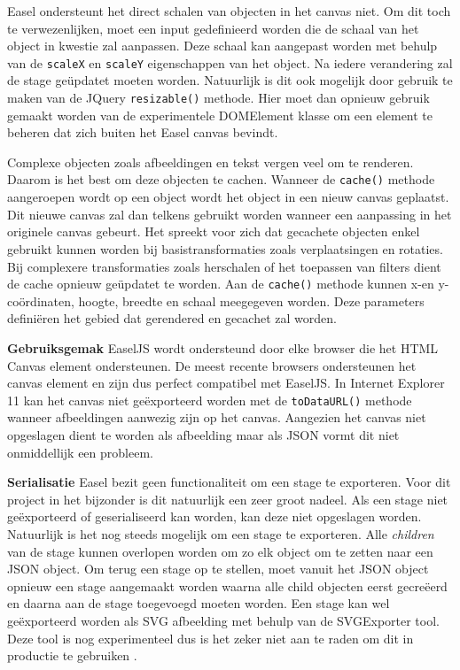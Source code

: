 Easel ondersteunt het direct schalen van objecten in het canvas niet. Om dit toch te verwezenlijken, moet een input gedefinieerd worden die de schaal van het object in kwestie zal aanpassen. Deze schaal kan aangepast worden met behulp van de \texttt{scaleX} en \texttt{scaleY} eigenschappen van het object. Na iedere verandering zal de stage ge\"{u}pdatet moeten worden. Natuurlijk is dit ook mogelijk door gebruik te maken van de JQuery \texttt{resizable()} methode. Hier moet dan opnieuw gebruik gemaakt worden van de experimentele DOMElement klasse om een element te beheren dat zich buiten het Easel canvas bevindt. 

Complexe objecten zoals afbeeldingen en tekst vergen veel om te renderen. Daarom is het best om deze objecten te cachen. Wanneer de \texttt{cache()} methode aangeroepen wordt op een object wordt het object in een nieuw canvas geplaatst. Dit nieuwe canvas zal dan telkens gebruikt worden wanneer een aanpassing in het originele canvas gebeurt. Het spreekt voor zich dat gecachete objecten enkel gebruikt kunnen worden bij basistransformaties zoals verplaatsingen en rotaties. Bij complexere transformaties zoals herschalen of het toepassen van filters dient de cache opnieuw ge\"{u}pdatet te worden. Aan de \texttt{cache()} methode kunnen x-en y-co\"{o}rdinaten, hoogte, breedte en schaal meegegeven worden. Deze parameters defini\"{e}ren het gebied dat gerendered en gecachet zal worden. 

\textbf{Gebruiksgemak} \break
EaselJS wordt ondersteund door elke browser die het HTML Canvas element ondersteunen. De meest recente browsers ondersteunen het canvas element en zijn dus perfect compatibel met EaselJS. In Internet Explorer 11 kan het canvas niet ge\"{e}xporteerd worden met de \texttt{toDataURL()} methode wanneer afbeeldingen aanwezig zijn op het canvas. Aangezien het canvas niet opgeslagen dient te worden als afbeelding maar als JSON vormt dit niet onmiddellijk een probleem.

\textbf{Serialisatie} \break
Easel bezit geen functionaliteit om een stage te exporteren. Voor dit project in het bijzonder is dit natuurlijk een zeer groot nadeel. Als een stage niet ge\"{e}xporteerd of geserialiseerd kan worden, kan deze niet opgeslagen worden. Natuurlijk is het nog steeds mogelijk om een stage te exporteren. Alle \textit{children} van de stage kunnen overlopen worden om zo elk object om te zetten naar een JSON object. Om terug een stage op te stellen, moet vanuit het JSON object opnieuw een stage aangemaakt worden waarna alle child objecten eerst gecre\"{e}erd en daarna aan de stage toegevoegd moeten worden. Een stage kan wel ge\"{e}xporteerd worden als SVG afbeelding met behulp van de SVGExporter tool.  Deze tool is nog experimenteel dus is het zeker niet aan te raden om dit in productie te gebruiken \cite{SVGExporter}. 

